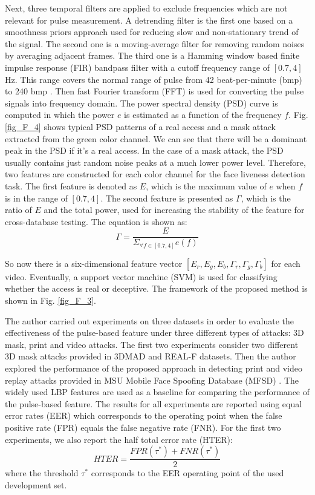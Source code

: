 \documentclass[journal]{IEEEtran}
\begin{document}
Next, three temporal filters are applied to exclude frequencies which are not relevant for pulse measurement. A detrending filter is the first one based on a smoothness priors approach \cite{tarvainen2002advanced} used for reducing slow and non-stationary trend of the signal. The second one is a moving-average filter for removing random noises by averaging adjacent frames. The third one is a Hamming window based finite impulse response (FIR) bandpass filter with a cutoff frequency range of $[0.7, 4]$ Hz. This range covers the normal range of pulse from 42 beat-per-minute (bmp) to 240 bmp \cite{poh2011advancements}. Then fast Fourier transform (FFT) is used for converting the pulse signals into frequency domain. The power spectral density (PSD) curve is computed in which the power $e$ is estimated as a function of the frequency $f$. Fig. \ref{fig_F_4} shows typical PSD patterns of a real access and a mask attack extracted from the green color channel. We can see that there will be a dominant peak in the PSD if it's a real access. In the case of a mask attack, the PSD usually contains just  random noise peaks at a much lower power level. Therefore, two features are constructed for each color channel for the face liveness detection task. The first feature is denoted as $E$, which is the maximum value of $e$ when $f$ is in the range of $[0.7, 4]$. The second feature is presented as $\Gamma$, which is the ratio of $E$ and the total power, used for increasing the stability of the feature for cross-database testing. The equation is shown as:
\begin{equation}
\label{eq_F_1}
\Gamma = \dfrac{E}{{\Sigma }_{\forall f\in \left[0.7,4\right]}e\left(f\right)}
\end{equation}

So now there is a six-dimensional feature vector $[E_r, E_g, E_b, {\Gamma}_r, {\Gamma}_g, {\Gamma}_b]$ for each video. Eventually, a support vector machine (SVM) \cite{chang2011libsvm} is used for classifying whether the access is real or deceptive. The framework of the proposed method is shown in Fig. \ref{fig_F_3}.

The author carried out experiments on three datasets in order to evaluate the effectiveness of the pulse-based feature under three different types of attacks: 3D mask, print and video attacks.  The first two experiments consider two different 3D mask attacks provided in 3DMAD and REAL-F datasets. Then the author explored the performance of the proposed approach in detecting print and video replay attacks provided in MSU Mobile Face Spoofing Database (MFSD) \cite{wen2015face}. The widely used LBP features are used as a baseline for comparing the performance of the pulse-based feature.  The results for all experiments are reported using equal error rates (EER) which corresponds to the operating point when the false positive rate (FPR) equals the false negative rate (FNR). For the first two experiments, we also report the half total error rate (HTER):
\begin{equation}
\label{eq_F_2}
HTER = \dfrac{FPR(\tau^{*})+FNR(\tau^{*})}{2}
\end{equation}
where the threshold $\tau^{*}$ corresponds to the EER operating point of the used development set.
\end{document}
